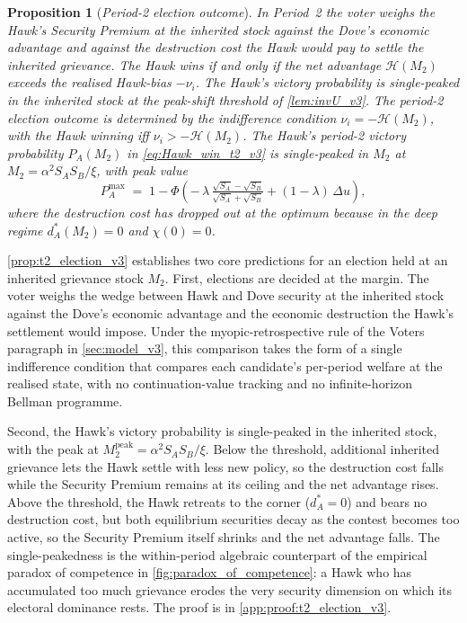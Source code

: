 \documentclass[11pt,twoside]{extarticle}
\newtheorem{proposition}{Proposition}
\begin{document}
\begin{proposition}[\emph{Period-2 election outcome}]\label{prop:t2_election_v3}
\emph{In Period~2 the voter weighs the Hawk's Security Premium at the inherited stock against the Dove's economic advantage and against the destruction cost the Hawk would pay to settle the inherited grievance. The Hawk wins if and only if the net advantage $\mathcal H(M_2)$ exceeds the realised Hawk-bias $-\nu_i$. The Hawk's victory probability is single-peaked in the inherited stock at the peak-shift threshold of \autoref{lem:invU_v3}.}
The period-2 election outcome is determined by the indifference condition $\nu_i=-\mathcal H(M_2)$, with the Hawk winning iff $\nu_i>-\mathcal H(M_2)$. The Hawk's period-2 victory probability $P_A(M_2)$ in \autoref{eq:Hawk_win_t2_v3} is single-peaked in $M_2$ at $M_2=\alpha^2 S_A S_B/\xi$, with peak value
\begin{equation}\label{eq:P_A_max_v3}
    P_A^{\max}\;=\;1-\Phi\!\left(-\,\lambda\,\tfrac{\sqrt{S_A}-\sqrt{S_B}}{\sqrt{S_A}+\sqrt{S_B}}+(1-\lambda)\,\Delta u\right),
\end{equation}
where the destruction cost has dropped out at the optimum because in the deep regime $d_A^*(M_2)=0$ and $\chi(0)=0$.
\end{proposition}

\autoref{prop:t2_election_v3} establishes two core predictions for an election held at an inherited grievance stock $M_2$. First, elections are decided at the margin. The voter weighs the wedge between Hawk and Dove security at the inherited stock against the Dove's economic advantage and the economic destruction the Hawk's settlement would impose. Under the myopic-retrospective rule of the Voters paragraph in \autoref{sec:model_v3}, this comparison takes the form of a single indifference condition that compares each candidate's per-period welfare at the realised state, with no continuation-value tracking and no infinite-horizon Bellman programme.

Second, the Hawk's victory probability is single-peaked in the inherited stock, with the peak at $M_2^{\mathrm{peak}}=\alpha^2 S_A S_B/\xi$. Below the threshold, additional inherited grievance lets the Hawk settle with less new policy, so the destruction cost falls while the Security Premium remains at its ceiling and the net advantage rises. Above the threshold, the Hawk retreats to the corner ($d_A^*=0$) and bears no destruction cost, but both equilibrium securities decay as the contest becomes too active, so the Security Premium itself shrinks and the net advantage falls. The single-peakedness is the within-period algebraic counterpart of the empirical paradox of competence in \autoref{fig:paradox_of_competence}: a Hawk who has accumulated too much grievance erodes the very security dimension on which its electoral dominance rests. The proof is in \autoref{app:proof:t2_election_v3}.
\end{document}
